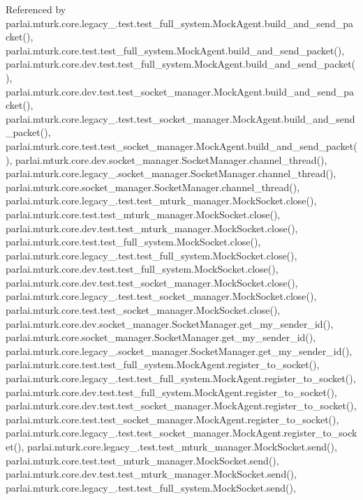 Referenced by parlai.\+mturk.\+core.\+legacy\+\_.\+test.\+test\+\_\+full\+\_\+system.\+Mock\+Agent.\+build\+\_\+and\+\_\+send\+\_\+packet(), parlai.\+mturk.\+core.\+test.\+test\+\_\+full\+\_\+system.\+Mock\+Agent.\+build\+\_\+and\+\_\+send\+\_\+packet(), parlai.\+mturk.\+core.\+dev.\+test.\+test\+\_\+full\+\_\+system.\+Mock\+Agent.\+build\+\_\+and\+\_\+send\+\_\+packet(), parlai.\+mturk.\+core.\+dev.\+test.\+test\+\_\+socket\+\_\+manager.\+Mock\+Agent.\+build\+\_\+and\+\_\+send\+\_\+packet(), parlai.\+mturk.\+core.\+legacy\+\_.\+test.\+test\+\_\+socket\+\_\+manager.\+Mock\+Agent.\+build\+\_\+and\+\_\+send\+\_\+packet(), parlai.\+mturk.\+core.\+test.\+test\+\_\+socket\+\_\+manager.\+Mock\+Agent.\+build\+\_\+and\+\_\+send\+\_\+packet(), parlai.\+mturk.\+core.\+dev.\+socket\+\_\+manager.\+Socket\+Manager.\+channel\+\_\+thread(), parlai.\+mturk.\+core.\+legacy\+\_.\+socket\+\_\+manager.\+Socket\+Manager.\+channel\+\_\+thread(), parlai.\+mturk.\+core.\+socket\+\_\+manager.\+Socket\+Manager.\+channel\+\_\+thread(), parlai.\+mturk.\+core.\+legacy\+\_.\+test.\+test\+\_\+mturk\+\_\+manager.\+Mock\+Socket.\+close(), parlai.\+mturk.\+core.\+test.\+test\+\_\+mturk\+\_\+manager.\+Mock\+Socket.\+close(), parlai.\+mturk.\+core.\+dev.\+test.\+test\+\_\+mturk\+\_\+manager.\+Mock\+Socket.\+close(), parlai.\+mturk.\+core.\+test.\+test\+\_\+full\+\_\+system.\+Mock\+Socket.\+close(), parlai.\+mturk.\+core.\+legacy\+\_.\+test.\+test\+\_\+full\+\_\+system.\+Mock\+Socket.\+close(), parlai.\+mturk.\+core.\+dev.\+test.\+test\+\_\+full\+\_\+system.\+Mock\+Socket.\+close(), parlai.\+mturk.\+core.\+dev.\+test.\+test\+\_\+socket\+\_\+manager.\+Mock\+Socket.\+close(), parlai.\+mturk.\+core.\+legacy\+\_.\+test.\+test\+\_\+socket\+\_\+manager.\+Mock\+Socket.\+close(), parlai.\+mturk.\+core.\+test.\+test\+\_\+socket\+\_\+manager.\+Mock\+Socket.\+close(), parlai.\+mturk.\+core.\+dev.\+socket\+\_\+manager.\+Socket\+Manager.\+get\+\_\+my\+\_\+sender\+\_\+id(), parlai.\+mturk.\+core.\+socket\+\_\+manager.\+Socket\+Manager.\+get\+\_\+my\+\_\+sender\+\_\+id(), parlai.\+mturk.\+core.\+legacy\+\_.\+socket\+\_\+manager.\+Socket\+Manager.\+get\+\_\+my\+\_\+sender\+\_\+id(), parlai.\+mturk.\+core.\+test.\+test\+\_\+full\+\_\+system.\+Mock\+Agent.\+register\+\_\+to\+\_\+socket(), parlai.\+mturk.\+core.\+legacy\+\_.\+test.\+test\+\_\+full\+\_\+system.\+Mock\+Agent.\+register\+\_\+to\+\_\+socket(), parlai.\+mturk.\+core.\+dev.\+test.\+test\+\_\+full\+\_\+system.\+Mock\+Agent.\+register\+\_\+to\+\_\+socket(), parlai.\+mturk.\+core.\+dev.\+test.\+test\+\_\+socket\+\_\+manager.\+Mock\+Agent.\+register\+\_\+to\+\_\+socket(), parlai.\+mturk.\+core.\+test.\+test\+\_\+socket\+\_\+manager.\+Mock\+Agent.\+register\+\_\+to\+\_\+socket(), parlai.\+mturk.\+core.\+legacy\+\_.\+test.\+test\+\_\+socket\+\_\+manager.\+Mock\+Agent.\+register\+\_\+to\+\_\+socket(), parlai.\+mturk.\+core.\+legacy\+\_.\+test.\+test\+\_\+mturk\+\_\+manager.\+Mock\+Socket.\+send(), parlai.\+mturk.\+core.\+test.\+test\+\_\+mturk\+\_\+manager.\+Mock\+Socket.\+send(), parlai.\+mturk.\+core.\+dev.\+test.\+test\+\_\+mturk\+\_\+manager.\+Mock\+Socket.\+send(), parlai.\+mturk.\+core.\+legacy\+\_.\+test.\+test\+\_\+full\+\_\+system.\+Mock\+Socket.\+send(), 